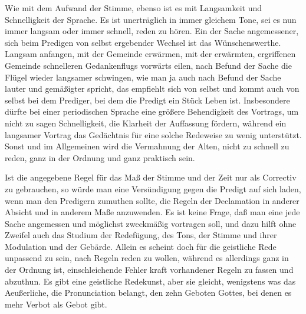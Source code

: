 Wie mit dem Aufwand der Stimme, ebenso ist es mit Langsamkeit und Schnelligkeit der Sprache. Es ist unerträglich in immer gleichem Tone, sei es nun immer langsam oder immer schnell, reden zu hören. Ein der Sache angemessener, sich beim Predigen von selbst ergebender Wechsel ist das Wünschenswerthe. Langsam anfangen, mit der Gemeinde erwärmen, mit der erwärmten, ergriffenen Gemeinde schnelleren Gedankenflugs vorwärts eilen, nach Befund der Sache die Flügel wieder langsamer schwingen, wie man ja auch nach Befund der Sache lauter und gemäßigter spricht, das empfiehlt sich von selbst und kommt auch von selbst bei dem Prediger, bei dem die Predigt ein Stück Leben ist. Insbesondere dürfte bei einer periodischen Sprache eine größere Behendigkeit des Vortrags, um nicht zu sagen Schnelligkeit, die Klarheit der Auffassung fördern, während ein langsamer Vortrag das
Gedächtnis für eine solche Redeweise zu wenig unterstützt. Sonst und im Allgemeinen wird die Vermahnung der Alten, nicht zu schnell zu reden, ganz in der Ordnung und ganz praktisch sein.

Ist die angegebene Regel für das Maß der Stimme und der Zeit nur als Correctiv zu gebrauchen, so würde man eine Versündigung gegen die Predigt auf sich laden, wenn man den Predigern zumuthen sollte, die Regeln der Declamation in anderer Absicht und in anderem Maße anzuwenden. Es ist keine Frage, daß man eine jede Sache angemessen und möglichst zweckmäßig vortragen soll, und dazu hilft ohne Zweifel auch das Studium der Redefügung, des Tons, der Stimme und ihrer Modulation und der Gebärde. Allein es scheint doch für die geistliche Rede unpassend zu sein, nach Regeln reden zu wollen, während es allerdings ganz in der Ordnung ist, einschleichende Fehler kraft vorhandener Regeln zu fassen und abzuthun. Es gibt eine geistliche Redekunst, aber sie gleicht, wenigstens was das Aeußerliche, die Pronunciation belangt, den zehn Geboten Gottes, bei denen es mehr Verbot als Gebot gibt.

